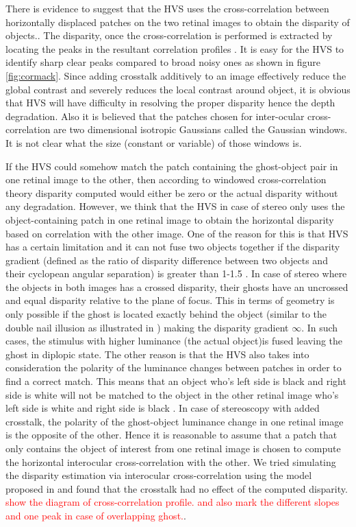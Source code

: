 There is evidence to suggest that the HVS uses the cross-correlation between horizontally displaced patches on the two retinal images to obtain the disparity of objects.\cite{filippini2009limits}\cite{banksLimits}. The disparity, once the cross-correlation is performed is extracted by locating the peaks in the resultant correlation profiles \cite{cormack1991interocular}. It is easy for the HVS to identify sharp clear peaks compared to broad noisy ones as shown in figure \ref{fig:cormack}. Since adding crosstalk additively to an image effectively reduce the global contrast and severely reduces the local contrast around object, it is obvious that HVS will have difficulty in resolving the proper disparity hence the depth degradation. Also it is believed that the patches chosen for inter-ocular cross-correlation are two dimensional isotropic Gaussians\cite{filippini2009limits} called the Gaussian windows. It is not clear what the size (constant or variable) of those windows is.

If the HVS could somehow match the patch containing the ghost-object pair in one retinal image to the other, then according to windowed cross-correlation theory disparity computed would either be zero or the actual disparity without any degradation. However, we think that the HVS in case of stereo only uses the object-containing patch in one retinal image to obtain the horizontal disparity based on correlation with the other image. One of the reason for this is that HVS has a certain limitation and it can not fuse two objects together if the disparity gradient (defined as the ratio of disparity difference between two objects and their cyclopean angular separation) is greater than 1-1.5 \cite{howard1995binocular} \cite{banksLimits}. In case of stereo where the objects in both images has a crossed disparity, their ghosts have an uncrossed and equal disparity relative to the plane of focus. This in terms of geometry is only possible if the ghost is located exactly behind the object (similar to the double nail illusion as illustrated in \cite{tsirlin2012effect} \cite{krol1980double}) making the disparity gradient $\infty$. In such cases, the stimulus with higher luminance (the actual object)is fused leaving the ghost in diplopic state. The other reason is that the HVS also takes into consideration the polarity of the luminance changes between patches in order to find a correct match. This means that an object who's left side is black and right side is white will not be matched to the object in the other retinal image who's left side is white and right side is black \cite{howard1995binocular}. In case of stereoscopy with added crosstalk, the polarity of the ghost-object luminance change in one retinal image is the opposite of the other. Hence it is reasonable to assume that a patch that only contains the object of interest from one retinal image is chosen to compute the horizontal interocular cross-correlation with the other. We tried simulating the disparity estimation via interocular cross-correlation using the model proposed in \cite{filippini2009limits} and found that the crosstalk had no effect of the computed disparity. \textcolor{red}{show the diagram of cross-correlation profile. and also mark the different slopes and one peak in case of overlapping ghost.}.

